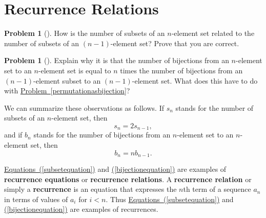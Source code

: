 \documentclass[10pt,]{book}
\newcommand{\terminology}[1]{\textbf{#1}}
\theoremstyle{plain}
\theoremstyle{definition}
\newtheorem{activity}[project]{Problem}
\theoremstyle{definition}
\numberwithin{equation}{chapter}
\newcommand{\lt}{<}
\begin{document}
\section[{Recurrence Relations}]{Recurrence Relations}\label{sec_induction-recurrence}
\begin{activity}[]\marginsymbol[-1em]{} \label{activity-87}
How is the number of subsets of an \(n\)-element set related to the number of subsets of an \((n - 1)\)-element set? Prove that you are correct.%
\end{activity}
\begin{activity}[]\marginsymbol[-1em]{} \label{activity-88}
Explain why it is that the number of bijections from an \(n\)-element set to an \(n\)-element set is equal to \(n\) times the number of bijections from an \((n-1)\)-element subset to an \((n-1)\)-element set. What does this have to do with \hyperref[permutationasbijection]{Problem~\ref{permutationasbijection}}?%
\end{activity}
We can summarize these observations as follows. If \(s_n\) stands for the number of subsets of an \(n\)-element set, then%
\begin{equation}
s_n =2s_{n-1},\label{subsetequation}
\end{equation}
and if \(b_n\) stands for the number of bijections from an \(n\)-element set to an \(n\)-element set, then%
\begin{equation}
b_n =
nb_{n-1}.\label{bijectionequation}
\end{equation}
%
\par
\hyperref[subsetequation]{Equations~(\ref{subsetequation})} and \hyperref[bijectionequation]{(\ref{bijectionequation})} are examples of \terminology{recurrence equations} or \terminology{recurrence relations}. A \terminology{recurrence relation} or simply a \terminology{recurrence} is an equation that expresses the \(n\)th term of a sequence \(a_n\) in terms of values of \(a_i\) for \(i\lt n\). Thus \hyperref[subsetequation]{Equations~(\ref{subsetequation})} and \hyperref[bijectionequation]{(\ref{bijectionequation})} are examples of recurrences.%
\typeout{************************************************}
\typeout{************************************************}
\end{document}
